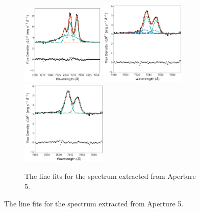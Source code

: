 \begin{figure}
\begin{subfigure}[t]{0.9\linewidth}
        \hspace{1.42cm}
        \includegraphics[width=0.435\textwidth]{figures/muse_f13451_1232/line_fits/ap5_halpha_no_nuclear_model.png}
        \vfill
        \includegraphics[width=0.45\textwidth]{figures/muse_f13451_1232/line_fits/ap5_sii.png}
        \hspace{1.3cm}
        \includegraphics[width=0.45\textwidth]{figures/muse_f13451_1232/line_fits/ap5_sii_no_nuclear_model.png}
        \label{fig: muse_f13451_1232: analysis_and_results: extended_emission: ap5_line_fits}
        \caption{The line fits for the spectrum extracted from Aperture 5.}
    \end{subfigure}
\end{figure}

\clearpage
\newpage

